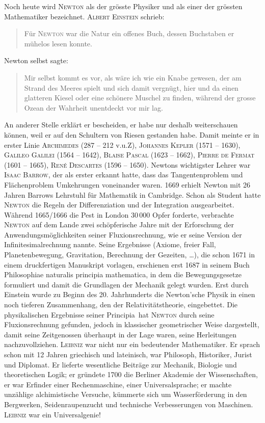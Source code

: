 \documentclass[%
11pt,%
twoside,%
titlepage,%
german,%
headsepline%
]{scrartcl}
\begin{document}
Noch heute wird \textsc{Newton} als der gr\"osste Physiker und als einer der gr\"ossten Mathematiker bezeichnet. \textsc{Albert Einstein} schrieb:
\begin{quote}
\glqq F\"ur \textsc{Newton} war die Natur ein offenes Buch, dessen Buchstaben er m\"uhelos lesen konnte.\grqq
\end{quote}
Newton selbst sagte: 
\begin{quote}
\glqq Mir selbst kommt es vor, als w\"are ich wie ein Knabe gewesen, der am Strand des Meeres spielt und sich damit vergn\"ugt, hier und da einen glatteren Kiesel oder eine sch\"onere Muschel zu finden, w\"ahrend der grosse Ozean der Wahrheit unentdeckt vor mir lag.\grqq
\end{quote}
An anderer Stelle erkl\"art er bescheiden, er habe nur deshalb weiterschauen k\"onnen, weil er auf den Schultern von Riesen gestanden habe. Damit meinte er in erster Linie \textsc{Archimedes} (287 -- 212 v.u.Z), \textsc{Johannes Kepler} (1571 -- 1630), \textsc{Galileo Galilei} (1564 -- 1642), \textsc{Blaise Pascal} (1623 -- 1662), \textsc{Pierre de Fermat} (1601 -- 1665), \textsc{Ren\'e Descartes} (1596 -- 1650).
Newtons wichtigster Lehrer war \textsc{Isaac Barrow}, der als erster erkannt hatte, dass das Tangentenproblem und Fl\"achenproblem Umkehrungen voneinander waren. 1669 erhielt Newton mit 26 Jahren Barrows Lehrstuhl f\"ur Mathematik in Cambridge.
Schon als Student hatte \textsc{Newton} die Regeln der Differenziation und der Integration ausgearbeitet. W\"ahrend 1665/1666 die Pest in London $30\,000$ Opfer forderte, verbrachte \textsc{Newton} auf dem Lande zwei sch\"opferische Jahre mit der Erforschung der Anwendungsm\"oglichkeiten seiner Fluxionsrechnung, wie er seine Version der Infinitesimalrechnung nannte. Seine Ergebnisse (Axiome, freier Fall, Planetenbewegung, Gravitation, Berechnung der Gezeiten, \dots), die schon 1671 in einem druckfertigen Manuskript vorlagen, erschienen erst 1687 in seinem Buch \glqq Philosophiae naturalis principia mathematica\grqq, in dem die Bewegungsgesetze formuliert und damit die Grundlagen der Mechanik gelegt wurden. Erst durch Einstein wurde zu Beginn des 20. Jahrhunderts die Newton'sche Physik in einen noch tieferen Zusammenhang, den der Relativit\"atstheorie, eingebettet. Die physikalischen Ergebnisse seiner \glqq Principia\grqq\  hat \textsc{Newton} durch seine Fluxionsrechnung gefunden, jedoch in klassischer geometrischer Weise dargestellt, damit seine Zeitgenossen \"uberhaupt in der Lage waren, seine Herleitungen nachzuvollziehen.
\textsc{Leibniz} war nicht nur ein bedeutender Mathematiker. Er sprach schon mit 12 Jahren griechisch und lateinisch, war Philosoph, Historiker, Jurist und Diplomat. Er lieferte wesentliche Beitr\"age zur Mechanik, Biologie und theoretischen Logik; er gr\"undete 1700 die Berliner Akademie der Wissenschaften, er war Erfinder einer Rechenmaschine, einer Universalsprache; er machte unz\"ahlige alchimistische Versuche, k\"ummerte sich um Wasserf\"orderung in den Bergwerken, Seidenraupenzucht und technische Verbesserungen von Maschinen. \textsc{Leibniz} war ein Universalgenie!
\end{document}
